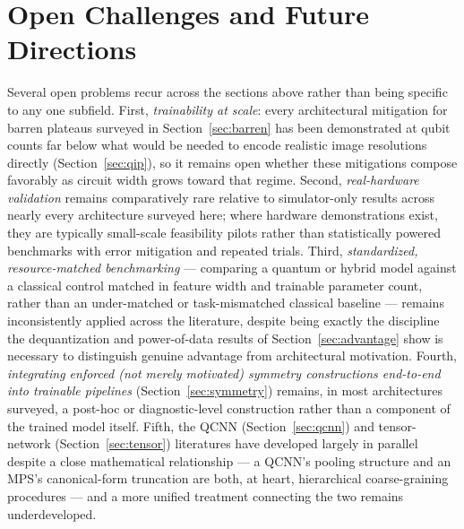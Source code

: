\documentclass[11pt]{article}
\begin{document}
\section{Open Challenges and Future Directions}
\label{sec:challenges}
Several open problems recur across the sections above rather than being specific to any one subfield. First, \emph{trainability at scale}: every architectural mitigation for barren plateaus surveyed in Section~\ref{sec:barren} has been demonstrated at qubit counts far below what would be needed to encode realistic image resolutions directly (Section~\ref{sec:qip}), so it remains open whether these mitigations compose favorably as circuit width grows toward that regime. Second, \emph{real-hardware validation} remains comparatively rare relative to simulator-only results across nearly every architecture surveyed here; where hardware demonstrations exist, they are typically small-scale feasibility pilots rather than statistically powered benchmarks with error mitigation and repeated trials. Third, \emph{standardized, resource-matched benchmarking} — comparing a quantum or hybrid model against a classical control matched in feature width and trainable parameter count, rather than an under-matched or task-mismatched classical baseline — remains inconsistently applied across the literature, despite being exactly the discipline the dequantization and power-of-data results of Section~\ref{sec:advantage} show is necessary to distinguish genuine advantage from architectural motivation. Fourth, \emph{integrating enforced (not merely motivated) symmetry constructions end-to-end into trainable pipelines} (Section~\ref{sec:symmetry}) remains, in most architectures surveyed, a post-hoc or diagnostic-level construction rather than a component of the trained model itself. Fifth, the QCNN (Section~\ref{sec:qcnn}) and tensor-network (Section~\ref{sec:tensor}) literatures have developed largely in parallel despite a close mathematical relationship — a QCNN's pooling structure and an MPS's canonical-form truncation are both, at heart, hierarchical coarse-graining procedures — and a more unified treatment connecting the two remains underdeveloped.
\end{document}

